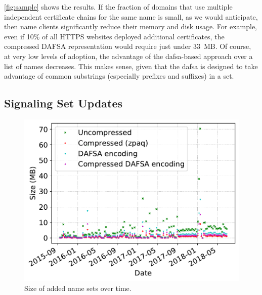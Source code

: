 \autoref{fig:sample} shows the results. If the fraction of
domains that use multiple independent certificate chains for the same name is
small, as we would anticipate, then \ac{name} clients 
significantly reduce their memory and disk usage. 
For example, even if 10\% of all HTTPS websites deployed additional certificates,
the compressed DAFSA representation would require just under 33~MB.
Of course, at very low levels of adoption,
the advantage of the \ac{dafsa}-based
approach over a list of names decreases. This makes sense, given that the
\ac{dafsa} is designed to take advantage of common substrings (especially
prefixes and suffixes) in a set.

\subsection{Signaling Set Updates}
\label{sec:evaluation:updates}


\begin{figure}[t]
  \centering
  \includegraphics[width=\linewidth]{fig/added_name_set_size}
  \caption{Size of added name sets over time.}
  \label{fig:updates:added}
\end{figure}

